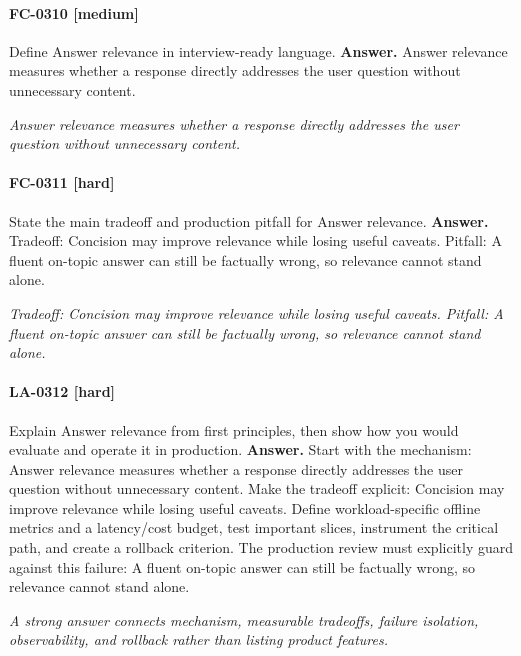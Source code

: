 \paragraph{FC-0310 [medium]} Define Answer relevance in interview-ready language.
\noindent\textbf{Answer.} Answer relevance measures whether a response directly addresses the user question without unnecessary content.
\par\textit{Answer relevance measures whether a response directly addresses the user question without unnecessary content.}
\paragraph{FC-0311 [hard]} State the main tradeoff and production pitfall for Answer relevance.
\noindent\textbf{Answer.} Tradeoff: Concision may improve relevance while losing useful caveats. Pitfall: A fluent on-topic answer can still be factually wrong, so relevance cannot stand alone.
\par\textit{Tradeoff: Concision may improve relevance while losing useful caveats. Pitfall: A fluent on-topic answer can still be factually wrong, so relevance cannot stand alone.}
\paragraph{LA-0312 [hard]} Explain Answer relevance from first principles, then show how you would evaluate and operate it in production.
\noindent\textbf{Answer.} Start with the mechanism: Answer relevance measures whether a response directly addresses the user question without unnecessary content. Make the tradeoff explicit: Concision may improve relevance while losing useful caveats. Define workload-specific offline metrics and a latency/cost budget, test important slices, instrument the critical path, and create a rollback criterion. The production review must explicitly guard against this failure: A fluent on-topic answer can still be factually wrong, so relevance cannot stand alone.
\par\textit{A strong answer connects mechanism, measurable tradeoffs, failure isolation, observability, and rollback rather than listing product features.}
